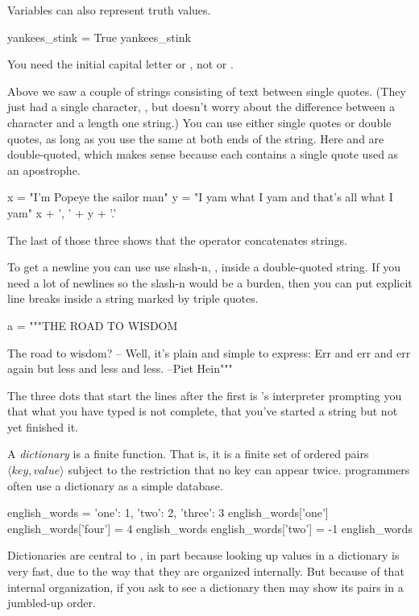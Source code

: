 Variables can also represent truth values.
\begin{pythonconsole}
yankees_stink = True
yankees_stink
\end{pythonconsole}
You need the initial capital letter\Dash
{}
or , not
or .
 
Above we saw a couple of strings consisting of text between single quotes.
(They just had a single character, ,
but \python{} doesn't worry about the difference between a character
and a length one string.)
You can use either single quotes or double quotes, as long as you use
the same at both ends of the string. 
Here  and 
are double-quoted, which makes sense because each contains a 
single quote used as an apostrophe. 
\begin{pythonconsole}
x = "I'm Popeye the sailor man"
y = "I yam what I yam and that's all what I yam"
x + ', ' + y + '.'
\end{pythonconsole}
The last of those three shows that the \inlinecode{+} operator 
concatenates strings. 

To get a newline you can use use slash-n, \inlinecode{\\n}, 
inside a double-quoted string.
If you need a lot of newlines so the slash-n would be a burden, then
you can put explicit line breaks inside a string marked by triple quotes.
\begin{pythonconsole}
a = """THE ROAD TO WISDOM
 
The road to wisdom?
-- Well, it's plain
and simple to express:
Err
and err
and err again
but less
and less
and less. --Piet Hein"""
\end{pythonconsole} 
The three dots that start the lines after the first
is \python's
interpreter prompting you that what you have typed is not complete,
that you've started a string but not yet finished it.

A \python{} \textit{dictionary} is a finite function.
That is, it is a finite
set of ordered pairs $\langle\textit{key},\textit{value}\rangle$ subject 
to the restriction that no key can appear twice.
\python{} programmers often use a dictionary as a simple database.
\begin{pythonconsole}
english_words = {'one': 1, 'two': 2, 'three': 3}
english_words['one']
english_words['four'] = 4  
english_words
english_words['two'] = -1
english_words
\end{pythonconsole} 
Dictionaries are central to \python, in part because looking up values 
in a dictionary is very fast, due to the way that they are 
organized internally.
But because of that internal organization,
if you ask to see a dictionary then \python{} may show its pairs in 
a jumbled-up order. %

